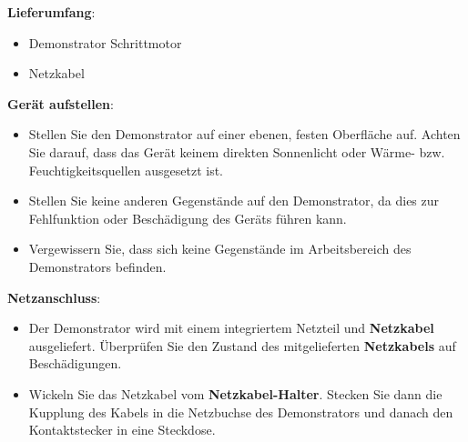 \newpage
\textbf{Lieferumfang}: 
\begin{itemize}
\item Demonstrator Schrittmotor	
\item Netzkabel
	\end{itemize} 	
	\bigskip
	\textbf{Gerät aufstellen}: 
	\begin{itemize}
	\item Stellen Sie den Demonstrator auf einer ebenen, festen Oberfläche auf. Achten Sie darauf, dass das Gerät keinem direkten Sonnenlicht oder Wärme- bzw. Feuchtigkeitsquellen ausgesetzt ist. 
	\item Stellen Sie keine anderen Gegenstände auf den Demonstrator, da dies zur Fehlfunktion oder Beschädigung des Geräts führen kann. 
	\item Vergewissern Sie, dass sich keine Gegenstände im Arbeitsbereich des Demonstrators befinden.
	\end{itemize}
	\textbf{Netzanschluss}:
	\begin{itemize}
		\item Der Demonstrator wird mit einem integriertem Netzteil und \textbf{Netzkabel} ausgeliefert. Überprüfen Sie den Zustand des mitgelieferten \textbf{Netzkabels} auf Beschädigungen.
		\item Wickeln Sie das Netzkabel vom \textbf{Netzkabel-Halter}. Stecken Sie dann die Kupplung des Kabels in die Netzbuchse des Demonstrators und danach den Kontaktstecker in eine Steckdose. 
	\end{itemize} 



